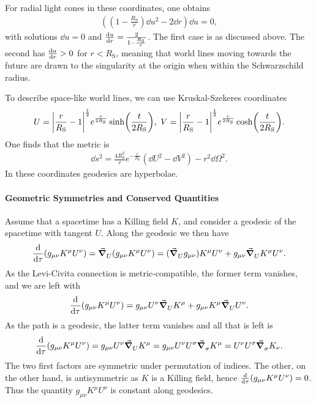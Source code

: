 For radial light cones in these coordinates, one obtains
\begin{align*}
	\left(\left(1 - \frac{R_{\text{S}}}{r}\right)\dd{u}^{2} - 2\dd{r}\right)\dd{u} = 0,
\end{align*}
with solutions $\dd{u} = 0$ and $\dv{u}{r} = \frac{2}{1 - \frac{R_{\text{S}}}{r}}$. The first case is as discussed above. The second has $\dv{u}{r} > 0$ for $r < R_{\text{S}}$, meaning that world lines moving towards the future are drawn to the singularity at the origin when within the Schwarzschild radius.

To describe space-like world lines, we can use Kruskal-Szekeres coordinates
\begin{align*}
	U = \abs{\frac{r}{R_{\text{S}}} - 1}^{\frac{1}{2}}e^{\frac{r}{2R_{\text{S}}}}\sinh(\frac{t}{2R_{\text{S}}}),\ V = \abs{\frac{r}{R_{\text{S}}} - 1}^{\frac{1}{2}}e^{\frac{r}{2R_{\text{S}}}}\cosh(\frac{t}{2R_{\text{S}}}).
\end{align*}
One finds that the metric is
\begin{align*}
	\dd{s}^{2} = \frac{4R_{\text{S}}^{3}}{r}e^{-\frac{r}{R_{\text{S}}}}(\dd{U}^{2} - \dd{V}^{2}) - r^{2}\dd{\Omega}^{2}.
\end{align*}
In these coordinates geodesics are hyperbolae.

\paragraph{Geometric Symmetries and Conserved Quantities}
Assume that a spacetime has a Killing field $K$, and consider a geodesic of the spacetime with tangent $U$. Along the geodesic we then have
\begin{align*}
	\dv{\tau}(g_{\mu\nu}K^{\mu}U^{\nu}) = \grad_{U}^{}{(g_{\mu\nu}K^{\mu}U^{\nu})} = (\grad_{U}^{}{g_{\mu\nu}})K^{\mu}U^{\nu} + g_{\mu\nu}\grad_{U}^{}{K^{\mu}U^{\nu}}.
\end{align*}
As the Levi-Civita connection is metric-compatible, the former term vanishes, and we are left with
\begin{align*}
	\dv{\tau}(g_{\mu\nu}K^{\mu}U^{\nu}) = g_{\mu\nu}U^{\nu}\grad_{U}^{}{K^{\mu}} + g_{\mu\nu}K^{\mu}\grad_{U}^{}{U^{\nu}}.
\end{align*}
As the path is a geodesic, the latter term vanishes and all that is left is
\begin{align*}
	\dv{\tau}(g_{\mu\nu}K^{\mu}U^{\nu}) = g_{\mu\nu}U^{\nu}\grad_{U}^{}{K^{\mu}} = g_{\mu\nu}U^{\nu}U^{\sigma}\grad_{\sigma}^{}{K^{\mu}} = U^{\nu}U^{\sigma}\grad_{\sigma}^{}{K_{\nu}}.
\end{align*}
The two first factors are symmetric under permutation of indices. The other, on the other hand, is antisymmetric as $K$ is a Killing field, hence $\dv{\tau}(g_{\mu\nu}K^{\mu}U^{\nu}) = 0$. Thus the quantity $g_{\mu\nu}K^{\mu}U^{\nu}$ is constant along geodesics.

